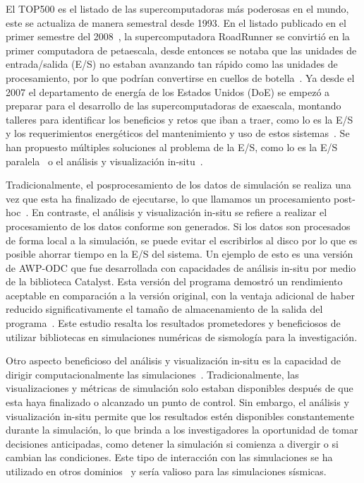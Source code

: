 El TOP500 es el listado de las supercomputadoras más poderosas en el mundo, este se actualiza de manera semestral desde 1993. En el listado publicado en el primer semestre del 2008~\cite{top500}, la supercomputadora RoadRunner se convirtió en la primer computadora de petaescala, desde entonces se notaba que las unidades de entrada/salida (E/S) no estaban avanzando tan rápido como las unidades de procesamiento, por lo que podrían convertirse en cuellos de botella~\cite{Narayan2009}. Ya desde el 2007 el departamento de energía de los Estados Unidos (DoE) se empezó a preparar para el desarrollo de las supercomputadoras de exaescala, montando talleres para identificar los beneficios y retos que iban a traer, como lo es la E/S y los requerimientos energéticos del mantenimiento y uso de estos sistemas~\cite{Messina2017}. Se han propuesto múltiples soluciones al problema de la E/S, como lo es la E/S paralela~\cite{Byna2022} o el análisis y visualización in-situ~\cite{akira_kageyama_approach_2014}.

Tradicionalmente, el posprocesamiento de los datos de simulación se realiza una vez que esta ha finalizado de ejecutarse, lo que llamamos un procesamiento post-hoc~\cite{childs_terminology_2020}. En contraste, el análisis y visualización in-situ se refiere a realizar el procesamiento de los datos conforme son generados. Si los datos son procesados de forma local a la simulación, se puede evitar el escribirlos al disco por lo que es posible ahorrar tiempo en la E/S del sistema. Un ejemplo de esto es una versión de AWP-ODC que fue desarrollada con capacidades de análisis in-situ por medio de la biblioteca Catalyst. Esta versión del programa demostró un rendimiento aceptable en comparación a la versión original, con la ventaja adicional de haber reducido significativamente el tamaño de almacenamiento de la salida del programa~\cite{mu_-situ_2019}. Este estudio resalta los resultados prometedores y beneficiosos de utilizar bibliotecas en simulaciones numéricas de sismología para la investigación.

Otro aspecto beneficioso del análisis y visualización in-situ es la capacidad de dirigir computacionalmente las simulaciones~\cite{Grosset2020}. Tradicionalmente, las visualizaciones y métricas de simulación solo estaban disponibles después de que esta haya finalizado o alcanzado un punto de control. Sin embargo, el análisis y visualización in-situ permite que los resultados estén disponibles constantemente durante la simulación, lo que brinda a los investigadores la oportunidad de tomar decisiones anticipadas, como detener la simulación si comienza a divergir o si cambian las condiciones. Este tipo de interacción con las simulaciones se ha utilizado en otros dominios~\cite{Yi2014} y sería valioso para las simulaciones sísmicas.

